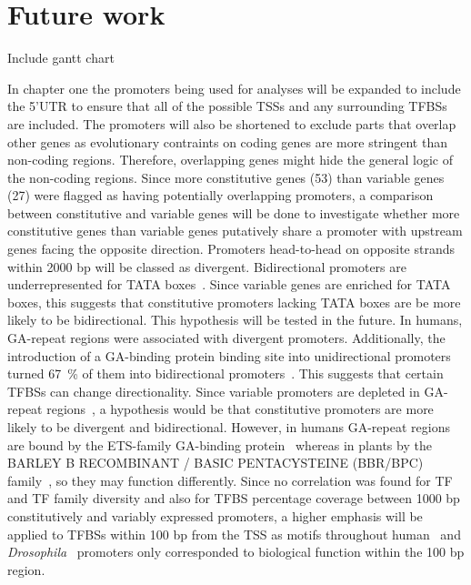 \section{Future work}
{\label{future-work}}

Include gantt chart

In chapter one the promoters being used for analyses will be expanded to include the 5'UTR to ensure that all of the possible TSSs and any surrounding TFBSs are included.
The promoters will also be shortened to exclude parts that overlap other genes as evolutionary contraints on coding genes are more stringent than non\hyp{}coding regions.
Therefore, overlapping genes might hide the general logic of the non\hyp{}coding regions.
Since more constitutive genes (53) than variable genes (27) were flagged as having potentially overlapping promoters, a comparison between constitutive and variable genes will be done to investigate whether more constitutive genes than variable genes putatively share a promoter with upstream genes facing the opposite direction.
Promoters head\hyp{}to\hyp{}head on opposite strands within 2000 bp will be classed as divergent.
Bidirectional promoters are underrepresented for TATA boxes~\autocite{dhadiGenomewideComparativeAnalysis2009}.
Since variable genes are enriched for TATA boxes, this suggests that constitutive promoters lacking TATA boxes are be more likely to be bidirectional.
This hypothesis will be tested in the future.
In humans, GA\hyp{}repeat regions were associated with divergent promoters. Additionally, the introduction of a GA\hyp{}binding protein binding site into unidirectional promoters turned \SI{67}{\percent} of them into bidirectional promoters~\autocite{collinsEtsRelatedTranscriptionFactor2007}.
This suggests that certain TFBSs can change directionality.
Since variable promoters are depleted in GA\hyp{}repeat regions~\autocite{yamamotoHeterogeneityArabidopsisCore2009}, a hypothesis would be that constitutive promoters are more likely to be divergent and bidirectional.
However, in humans GA\hyp{}repeat regions are bound by the ETS\hyp{}family GA\hyp{}binding protein~\autocite{collinsEtsRelatedTranscriptionFactor2007} whereas in plants by the BARLEY B RECOMBINANT / BASIC PENTACYSTEINE (BBR/BPC) family~\autocite{theunePhylogeneticAnalysesGAGAMotif2019}, so they may function differently.
Since no correlation was found for TF and TF family diversity and also for TFBS percentage coverage between 1000 bp constitutively and variably expressed promoters, a higher emphasis will be applied to TFBSs within 100 bp from the TSS as motifs throughout human~\autocite{fitzgeraldClusteringDNASequences2004} and \textit{Drosophila}~\autocite{fitzgeraldComparativeGenomicsDrosophila2006} promoters only corresponded to biological function within the 100 bp region.

